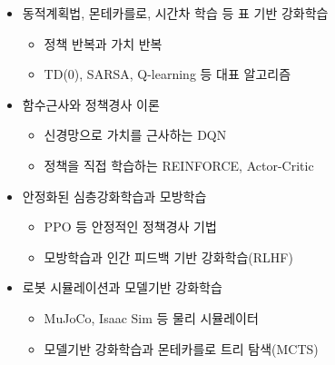 \documentclass[11pt,a4paper]{article}
\begin{document}
{\begin{minipage}{\dimexpr\textwidth-2\fboxsep-2\fboxrule}
\begin{itemize}[leftmargin=6mm,itemsep=1.2mm,topsep=1mm]
\begin{itemize}[leftmargin=5mm,itemsep=0.3mm,topsep=0.5mm]
\end{itemize}

\item 동적계획법, 몬테카를로, 시간차 학습 등 표 기반 강화학습

\begin{itemize}[leftmargin=5mm,itemsep=0.3mm,topsep=0.5mm]

\item[--] \small 정책 반복과 가치 반복

\item[--] \small TD(0), SARSA, Q-learning 등 대표 알고리즘

\end{itemize}

\item 함수근사와 정책경사 이론

\begin{itemize}[leftmargin=5mm,itemsep=0.3mm,topsep=0.5mm]

\item[--] \small 신경망으로 가치를 근사하는 DQN

\item[--] \small 정책을 직접 학습하는 REINFORCE, Actor-Critic

\end{itemize}

\item 안정화된 심층강화학습과 모방학습

\begin{itemize}[leftmargin=5mm,itemsep=0.3mm,topsep=0.5mm]

\item[--] \small PPO 등 안정적인 정책경사 기법

\item[--] \small 모방학습과 인간 피드백 기반 강화학습(RLHF)

\end{itemize}

\item 로봇 시뮬레이션과 모델기반 강화학습

\begin{itemize}[leftmargin=5mm,itemsep=0.3mm,topsep=0.5mm]

\item[--] \small MuJoCo, Isaac Sim 등 물리 시뮬레이터

\item[--] \small 모델기반 강화학습과 몬테카를로 트리 탐색(MCTS)

\end{itemize}

\end{itemize}
\vspace{2mm}
\end{minipage}}
\end{document}
